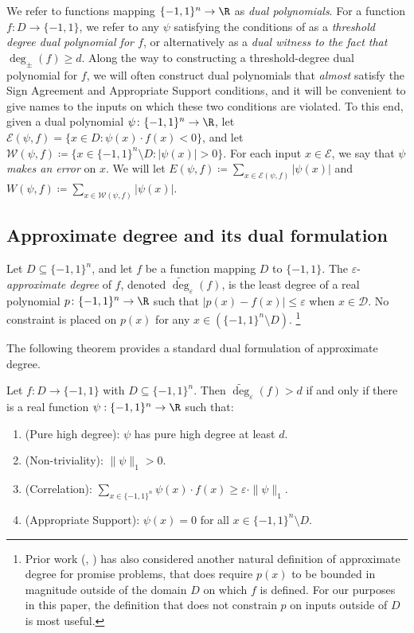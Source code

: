 \documentclass{toc}
\newcommand{\bits}{\{-1,1\}}
\newcommand{\eps}{\varepsilon}
\newcommand{\adeg}{\widetilde{\operatorname{deg}}}
\begin{document}
We refer to functions mapping $\bits^n \to \R$ as \emph{dual polynomials}. 
For a function $f \colon D \to \bits$, we refer to any $\psi$ satisfying the
%
conditions %
of  as a \emph{threshold
	degree dual polynomial for $f$}, or alternatively as a \emph{dual witness to the fact that $\deg_{\pm}(f) \geq d$}.
Along the way to constructing a threshold-degree %
 dual polynomial for $f$, we will often construct dual polynomials
that \emph{almost} satisfy the Sign Agreement and Appropriate Support conditions, and it will be convenient
to give names to the inputs on which these two conditions are violated. To this end,
given a dual polynomial $\psi \colon \bits^n \to \R$, let $\mathcal{E}(\psi, f) = \{x \in D \colon \psi(x) \cdot f(x) < 0\}$, 
and let $\mathcal{W}(\psi, f) \coloneqq  \{x \in \bits^n \setminus D \colon |\psi(x)| > 0\}$. For each input $x \in \mathcal{E}$,
we say that $\psi$ \emph{makes an error} on $x$.
We will let $E(\psi, f) \coloneqq  \sum_{x \in \mathcal{E}(\psi, f)} |\psi(x)|$
and $W(\psi, f) \coloneqq  \sum_{x \in \mathcal{W}(\psi, f)} |\psi(x)|$.


\subsection{Approximate degree and its dual formulation}
\begin{definition} \label{def:adeg}
	Let $D \subseteq \{-1, 1\}^n$, and let $f$ be a function mapping $D$ to $\{-1,1\}$.
	The $\eps$-\emph{approximate degree} of $f$, denoted $\adeg_{\eps}(f)$, is the least degree of a real polynomial $p \colon \bits^n \to \R$ such that $|p(x) -f(x)| \leq \eps$ when $x \in \mathcal{D}$.
	No constraint is placed on $p(x)$ for any $x \in (\bits^n \setminus D)$.%
%
\footnote{Prior work (\eg, \cite{aaronsonshi, bkt}) has also considered  %
another natural definition of approximate degree for promise problems, that does require $p(x)$ to be bounded in magnitude outside
of the domain $D$ on which $f$ is defined. For our purposes
in this paper, the definition that does not constrain
$p$ on inputs outside of $D$ is most useful.}
\end{definition}


The following theorem provides a standard dual formulation of approximate degree.
\begin{theorem}\label{theorem:adegdual}
	
	Let $f:D \to \{-1,1\}$ with $D \subseteq \{-1,1\}^n$. Then $\adeg_{\eps}(f) > d$ if and only if there is a real function $\psi: \bits^n \to \R$ such that:
	\begin{enumerate}
		\item (Pure high degree): $\psi$ has pure high degree at least $d$.
		\item (Non-triviality): $\|\psi\|_1 > 0$.
		\item (Correlation): $\sum_{x\in\bits^n} \psi(x) \cdot f(x) \geq \eps \cdot \|\psi\|_1$.
		\item (Appropriate Support): $\psi(x)=0$ for all $x \in \bits^n \setminus D$.
	\end{enumerate}
\end{theorem}
\end{document}
